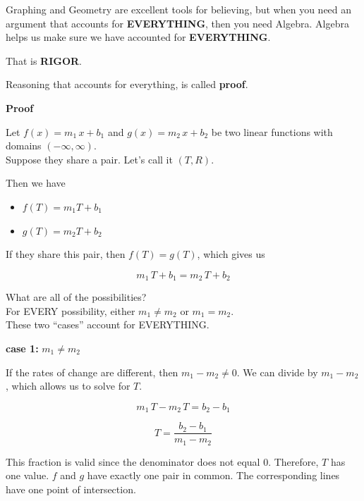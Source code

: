 \documentclass{ximera}
\begin{document}
Graphing and Geometry are excellent tools for believing, but when you need an argument that accounts for \textbf{\textcolor{purple!85!blue}{EVERYTHING}}, then you need Algebra.  Algebra helps us make sure we have accounted for \textbf{\textcolor{purple!85!blue}{EVERYTHING}}.  

That is \textbf{\textcolor{purple!85!blue}{RIGOR}}.  

Reasoning that accounts for everything, is called \textbf{proof}.














\begin{explanation} \textbf{\textcolor{red!75!green}{Proof}} 


Let $f(x) = m_1 \, x + b_1$ and $g(x) = m_2 \, x + b_2$ be two linear functions with domains $(-\infty, \infty)$. \\
Suppose they share a pair. Let's call it $(T, R)$.

Then we have 

\begin{itemize}
\item $f(T) = m_1 T + b_1$
\item $g(T) = m_2 T + b_2$
\end{itemize}

If they share this pair, then $f(T) = g(T)$, which gives us

\[     m_1 \, T + b_1 =  m_2 \, T + b_2  \]


What are all of the possibilities?  \\
For EVERY possibility, either $m_1 \ne m_2$ or $m_1 = m_2$.  \\
These two ``cases'' account for EVERYTHING.


\textbf{case 1:}  $m_1 \ne m_2$ 

If the rates of change are different, then  $m_1 - m_2 \ne 0$.  We can divide by $m_1 - m_2$, which allows us to solve for $T$.

\[     m_1 \, T - m_2 \, T =  b_2 -b_1 \]


\[     T =  \frac{b_2 -b_1}{m_1 - m_2}  \]

This fraction is valid since the denominator does not equal $0$.  Therefore, $T$ has one value.  $f$ and $g$ have exactly one pair in common.  The corresponding lines have one point of intersection.




\end{explanation}
\end{document}

